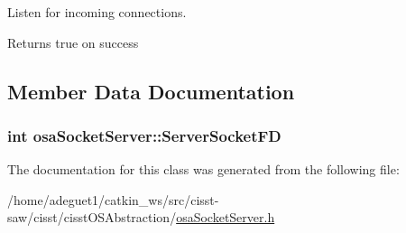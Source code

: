Listen for incoming connections. 

\begin{DoxyReturn}{Returns}
true on success 
\end{DoxyReturn}


\subsection{Member Data Documentation}
\hypertarget{classosa_socket_server_ad540b1c7de4c8d402ea98c937a7d8832}{
\subsubsection[{Server\-Socket\-F\-D}]{\setlength{\rightskip}{0pt plus 5cm}int osa\-Socket\-Server\-::\-Server\-Socket\-F\-D\hspace{0.3cm}{\ttfamily [protected]}}}\label{classosa_socket_server_ad540b1c7de4c8d402ea98c937a7d8832}


The documentation for this class was generated from the following file\-:\begin{DoxyCompactItemize}
\item 
/home/adeguet1/catkin\-\_\-ws/src/cisst-\/saw/cisst/cisst\-O\-S\-Abstraction/\hyperlink{osa_socket_server_8h}{osa\-Socket\-Server.\-h}\end{DoxyCompactItemize}
